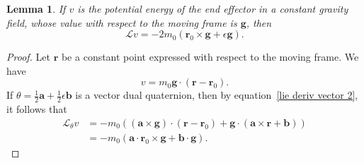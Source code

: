 \documentclass[reqno,12pt]{amsart}
\newcommand{\liederiv}{\mathcal L}
\newtheorem{Lemma}{Lemma}
\begin{document}

\begin{Lemma}
\label{lambda pot energy}
If $v$ is the potential energy of the end effector in a constant gravity field, whose value with respect to the moving frame is $\bm g$, then
\begin{equation}
\liederiv v = - 2 m_0 (\bm r_0 \times \bm g + \epsilon \bm g) .
\end{equation}
\end{Lemma}

\begin{proof}  Let $\bm r$ be a constant point expressed with respect to the moving frame.  We have
\begin{equation}
v = m_0 \bm g \cdot (\bm r - \bm r_0) .
\end{equation}
If $\theta = \tfrac12\bm a + \tfrac12 \epsilon \bm b$ is a vector dual quaternion, then by equation~\eqref{lie deriv vector 2}, it follows that
\begin{equation}
\begin{aligned}
\mathcal L_\theta v &= - m_0 ((\bm a \times \bm g) \cdot (\bm r - \bm r_0) + \bm g \cdot (\bm a \times \bm r + \bm b)) \\
&= -m_0 (\bm a \cdot \bm r_0 \times \bm g + \bm b \cdot \bm g ) .
\end{aligned}
\end{equation}
\end{proof}
\end{document}
